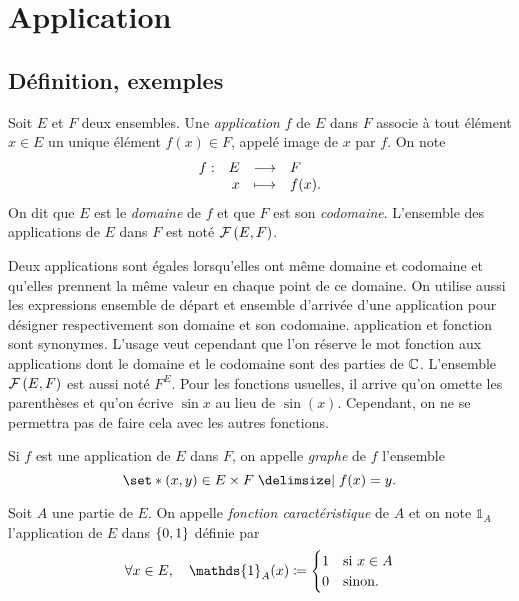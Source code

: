 \documentclass{magnoliaold}
\begin{document}
\section{Application}

\subsection{Définition, exemples}
\begin{definition}[utile=-3]
Soit $E$ et $F$ deux ensembles. Une \emph{application} $f$ de $E$ dans $F$ associe
à tout élément $x\in E$ un unique élément $f(x)\in F$, appelé image de $x$ par
$f$. On note
\[\begin{array}[t]{lrcl} \displaystyle{f} : & \displaystyle{E} & \longrightarrow & \displaystyle{F} \\ & \displaystyle{x} & \longmapsto & \displaystyle{f(x).} \end{array}\]
On dit que $E$ est le \emph{domaine} de $f$ et que $F$ est son \emph{codomaine}. L'ensemble des
applications de $E$ dans $F$ est noté $\mathcal{F}\left(E,F\right)$.
\end{definition}


\begin{remarques}
\remarque Deux applications sont égales lorsqu'elles ont même domaine et codomaine et qu'elles prennent la
  même valeur en chaque point de ce domaine.
\remarque On utilise aussi les expressions \og ensemble de départ \fg et \og ensemble d'arrivée \fg
  d'une application pour désigner respectivement son domaine et son codomaine.
\remarque \og application \fg et \og fonction \fg sont synonymes. L'usage veut cependant que l'on
  réserve le mot \og fonction \fg aux applications dont le domaine et le codomaine sont des parties de $\mathbb{C}$.
\remarque L'ensemble $\mathcal{F}\left(E,F\right)$ est aussi noté $F^E$.
\remarque Pour les fonctions usuelles, il arrive qu'on omette les parenthèses et
  qu'on écrive $\sin x$ au lieu de $\sin(x)$. Cependant, on ne se permettra pas de faire cela avec les
  autres fonctions.
\end{remarques}

\begin{definition}[utile=-3]
  Si $f$ est une application de $E$ dans $F$, on appelle \emph{graphe} de $f$ l'ensemble
  \[\enstq{\p{x,y}\in E\times F}{f(x)=y}.\]
  \end{definition}
  

\begin{definition}
Soit $A$ une partie de $E$. On appelle \emph{fonction caractéristique} de $A$ et on note $\mathds{1}_A$ l'application de $E$ dans $\left\{0,1\right\}$ définie
par
  \[\forall x\in E \qsep \mathds{1}_A(x)\defeq
    \begin{cases}
    1 & \text{si $x\in A$}\\
    0 & \text{sinon.}
    \end{cases}\]
\end{definition}
\end{document}
